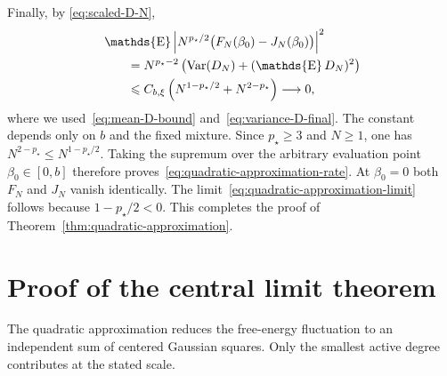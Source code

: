 \documentclass[letterpaper,11pt,reqno]{amsart}
\renewcommand{\leq}{\leqslant}
\renewcommand{\geq}{\geqslant}
\DeclareMathOperator{\E}{\mathds{E}}
\DeclareMathOperator{\var}{Var}
\begin{document}
Finally, by \eqref{eq:scaled-D-N},
\begin{align}
&\E\left|
N^{p_\star/2}
\bigl(F_N(\beta_0)-J_N(\beta_0)\bigr)
\right|^2
\notag\\
&\qquad=
N^{p_\star-2}
\left(
\var(D_N)+(\E D_N)^2
\right)
\notag\\
&\qquad\leq
C_{b,\xi}
\left(
N^{1-p_\star/2}+N^{2-p_\star}
\right)
\longrightarrow0,
\label{eq:quadratic-approximation-complete}
\end{align}
where we used~\eqref{eq:mean-D-bound} and~\eqref{eq:variance-D-final}. The constant depends only on $b$ and the fixed mixture. Since $p_\star\geq3$ and $N\geq1$, one has $N^{2-p_\star}\leq N^{1-p_\star/2}$. Taking the supremum over the arbitrary evaluation point $\beta_0\in[0,b]$ therefore proves~\eqref{eq:quadratic-approximation-rate}. At $\beta_0=0$ both $F_N$ and $J_N$ vanish identically. The limit~\eqref{eq:quadratic-approximation-limit} follows because $1-p_\star/2<0$. This completes the proof of Theorem~\ref{thm:quadratic-approximation}.







\section{Proof of the central limit theorem}
\label{sec:clt-proof}
The quadratic approximation reduces the free-energy fluctuation to an independent sum of centered Gaussian squares. Only the smallest active degree contributes at the stated scale.
\end{document}

